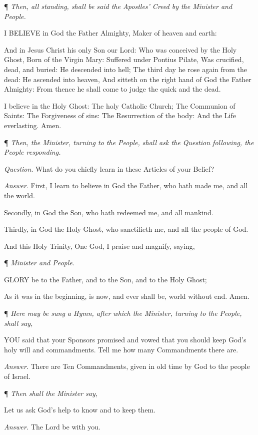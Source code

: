 ¶
\emph{Then, all standing, shall be said the Apostles' Creed by the Minister
and People.}

I
BELIEVE in God the Father Almighty, Maker of heaven and earth: 

And in Jesus Christ his only Son our Lord: Who was
conceived by the Holy Ghost, Born of the Virgin Mary: Suffered under Pontius
Pilate, Was crucified, dead, and buried: He descended into hell; The third
day he rose again from the dead: He ascended into heaven, And sitteth
on the right hand of God the Father Almighty: From thence he shall come
to judge the quick and the dead. 

I believe in the Holy Ghost: The holy Catholic Church;
The Communion of Saints: The Forgiveness of sins: The Resurrection of
the body: And the Life everlasting. Amen. 

¶
\emph{Then, the Minister, turning to the People, shall ask the Question
following, the People responding.}

\emph{Question}. What do you chiefly learn in these Articles of your
Belief?

\emph{Answer}. First, I learn to believe in God the
Father, who hath made me, and all the world. 

Secondly, in God the Son, who hath redeemed me, and
all mankind. 

Thirdly, in God the Holy Ghost, who sanctifieth me,
and all the people of God. 

And this Holy Trinity, One God, I praise and magnify,
saying,

¶
\emph{Minister and People.}

GLORY
be to the Father, and to the Son, and to the Holy Ghost; 

As it was in the beginning, is now,
and ever shall be, world without end. Amen.

¶
\emph{Here may be sung a Hymn, after which the Minister, turning to the
People, shall say,}

YOU
said that your Sponsors promised and vowed that you should keep God’s
holy will and commandments. Tell me how many Commandments there are. 

\emph{Answer}. There are Ten Commandments, given
in old time by God to the people of Israel.

¶
\emph{Then shall the Minister say,}

Let us
ask God's help to know and to keep them.

\emph{Answer.} The Lord be with
you. 

